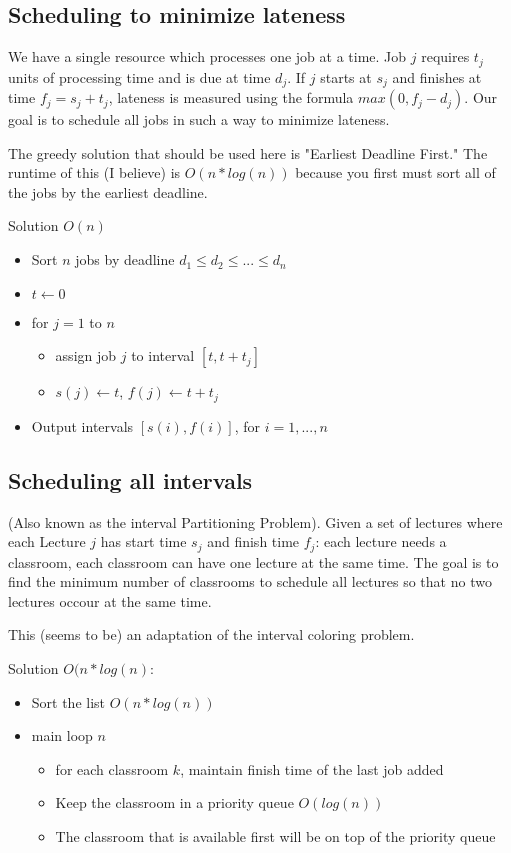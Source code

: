 \documentclass{article}
\begin{document}
\subsection{Scheduling to minimize lateness}
We have a single resource which processes one job at a time. Job $j$ requires $t_j$ units of processing time and is due at time $d_j$. If $j$ starts at $s_j$ and finishes at time $f_j = s_j + t_j$, lateness is measured using the formula $max(0, f_j - d_j)$. Our goal is to schedule all jobs in such a way to minimize lateness.

The greedy solution that should be used here is "Earliest Deadline First." The runtime of this (I believe) is $O(n*log(n))$ because you first must sort all of the jobs by the earliest deadline.

Solution $O(n)$ \begin{itemize}
    \item Sort $n$ jobs by deadline $d_1 \leq d_2 \leq ... \leq d_n$
    \item $t \gets 0$
    \item for $j = 1$ to $n$ \begin{itemize}
        \item assign job $j$ to interval $[t, t+t_j]$
        \item $s(j) \gets t$, $f(j) \gets t + t_j$
    \end{itemize}
    \item Output intervals $[s(i), f(i)]$, for $i=1,...,n$
\end{itemize}

\subsection{Scheduling all intervals}
(Also known as the interval Partitioning Problem). Given a set of lectures where each Lecture $j$ has start time $s_j$ and finish time $f_j$: each lecture needs a classroom, each classroom can have one lecture at the same time. The goal is to find the minimum number of classrooms to schedule all lectures so that no two lectures occour at the same time. 

This (seems to be) an adaptation of the interval coloring problem. 

Solution $O(n*log(n)$:
\begin{itemize}
    \item Sort the list $O(n*log(n))$
    \item main loop $n$ \begin{itemize}
        \item for each classroom $k$, maintain finish time of the last job added
        \item Keep the classroom in a priority queue $O(log(n))$
        \item The classroom that is available first will be on top of the priority queue
    \end{itemize}
\end{itemize}
\end{document}
